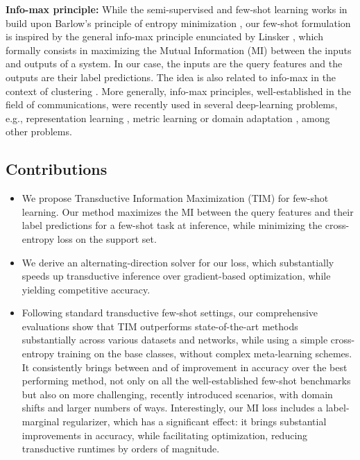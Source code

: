 \documentclass{article}
\begin{document}
        
        
        \textbf{Info-max principle:} While the semi-supervised and few-shot learning works in \cite{grandvalet2005semi,dhillon2019baseline} build upon Barlow's principle of entropy minimization \cite{Barlow1989Unsupervised}, our few-shot formulation is inspired by the general info-max principle enunciated by Linsker \cite{Linsker1988Self}, which formally consists in maximizing the Mutual Information (MI) between the inputs and outputs of a system. In our case, the inputs are the query features and the outputs are their label predictions. The idea is also related to info-max in the context of clustering \cite{clustering_infomax,HuICML17,jabi}. More generally, info-max principles, well-established in the field of communications, were recently used in several deep-learning problems, e.g., representation learning \cite{deep_infomax,cpc}, metric learning \cite{boudiaf2020metric} or domain adaptation \cite{liang2020we}, among other problems.   
        
        






    \subsection{Contributions}
        \begin{itemize}
            \item We propose Transductive Information Maximization (TIM) for few-shot learning. Our method maximizes the MI between the query features and their label predictions for a few-shot task at inference, while minimizing the cross-entropy loss on the support set.
            \item We derive an alternating-direction solver for our loss, which substantially speeds up transductive inference over gradient-based optimization, while yielding competitive accuracy.
            \item Following standard transductive few-shot settings, our comprehensive evaluations show that TIM outperforms state-of-the-art methods substantially across various datasets and networks,  while using a simple cross-entropy training on the base classes, without complex meta-learning schemes. It consistently brings between  and  of improvement in accuracy over the best performing method, not only on all the well-established few-shot benchmarks but also on more challenging, recently introduced scenarios, with domain shifts and larger numbers of ways. Interestingly, our MI loss includes a label-marginal regularizer, which has a significant effect: it brings substantial improvements in accuracy, while facilitating optimization, reducing transductive runtimes by orders of magnitude.

        \end{itemize}
\end{document}
